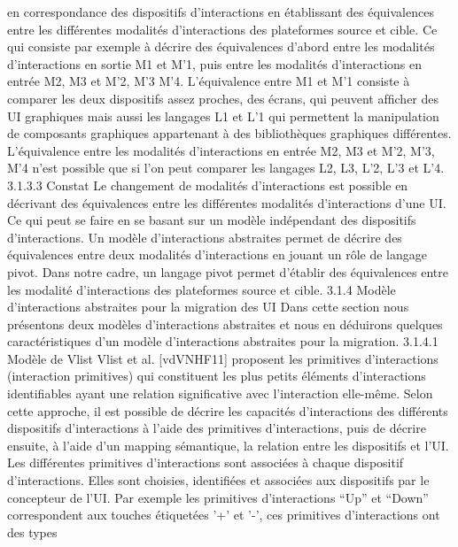 \documentclass{article}
\begin{document}
en correspondance des dispositifs d’interactions en \'{e}tablissant des \'{e}quivalences entre les diff\'{e}rentes
modalit\'{e}s d’interactions des plateformes source et cible. Ce qui consiste par exemple \`{a} d\'{e}crire des
\'{e}quivalences d’abord entre les modalit\'{e}s d’interactions en sortie M1 et M’1, puis entre les modalit\'{e}s
d’interactions en entr\'{e}e M2, M3 et M’2, M’3 M’4.
L’\'{e}quivalence entre M1 et M’1 consiste \`{a} comparer les deux dispositifs assez proches, des \'{e}crans,
qui peuvent afﬁcher des UI graphiques mais aussi les langages L1 et L’1 qui permettent la manipulation de composants graphiques appartenant \`{a} des biblioth\`{e}ques graphiques diff\'{e}rentes. L’\'{e}quivalence
entre les modalit\'{e}s d’interactions en entr\'{e}e M2, M3 et M’2, M’3, M’4 n’est possible que si l’on peut
comparer les langages L2, L3, L’2, L’3 et L’4.
3.1.3.3
Constat
Le changement de modalit\'{e}s d’interactions est possible en d\'{e}crivant des \'{e}quivalences entre les
diff\'{e}rentes modalit\'{e}s d’interactions d’une UI. Ce qui peut se faire en se basant sur un mod\`{e}le ind\'{e}pendant des dispositifs d’interactions.
Un mod\`{e}le d’interactions abstraites permet de d\'{e}crire des \'{e}quivalences entre deux modalit\'{e}s d’interactions en jouant un r\^{o}le de langage pivot. Dans notre cadre, un langage pivot permet d’\'{e}tablir des
\'{e}quivalences entre les modalit\'{e} d’interactions des plateformes source et cible.
3.1.4
Mod\`{e}le d’interactions abstraites pour la migration des UI
Dans cette section nous pr\'{e}sentons deux mod\`{e}les d’interactions abstraites et nous en d\'{e}duirons
quelques caract\'{e}ristiques d’un mod\`{e}le d’interactions abstraites pour la migration.
3.1.4.1
Mod\`{e}le de Vlist
Vlist et al.
[vdVNHF11] proposent les primitives d’interactions (interaction primitives) qui
constituent les plus petits \'{e}l\'{e}ments d’interactions identiﬁables ayant une relation signiﬁcative avec
l’interaction elle-m\^{e}me. Selon cette approche, il est possible de d\'{e}crire les capacit\'{e}s d’interactions
des diff\'{e}rents dispositifs d’interactions \`{a} l’aide des primitives d’interactions, puis de d\'{e}crire ensuite,
\`{a} l’aide d’un mapping s\'{e}mantique, la relation entre les dispositifs et l’UI. Les diff\'{e}rentes primitives
d’interactions sont associ\'{e}es \`{a} chaque dispositif d’interactions. Elles sont choisies, identiﬁ\'{e}es et associ\'{e}es aux dispositifs par le concepteur de l’UI. Par exemple les primitives d’interactions “Up” et
“Down” correspondent aux touches \'{e}tiquet\'{e}es ’+’ et ’-’, ces primitives d’interactions ont des types
\end{document}
